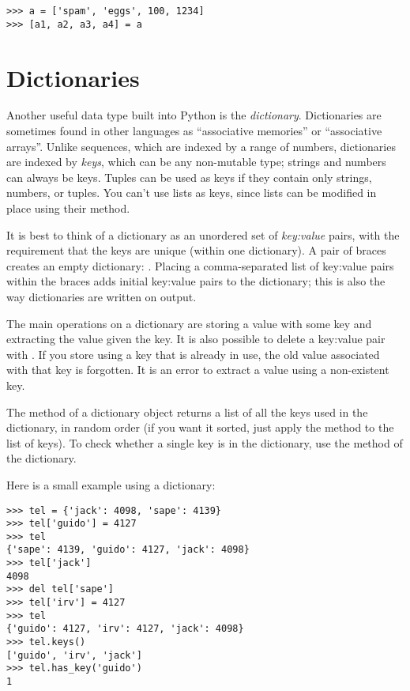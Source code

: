 \documentclass{manual}
\begin{document}
\begin{verbatim}
>>> a = ['spam', 'eggs', 100, 1234]
>>> [a1, a2, a3, a4] = a
\end{verbatim}

\section{Dictionaries}
\label{dictionaries}

Another useful data type built into Python is the \emph{dictionary}.
Dictionaries are sometimes found in other languages as ``associative
memories'' or ``associative arrays''.  Unlike sequences, which are
indexed by a range of numbers, dictionaries are indexed by \emph{keys},
which can be any non-mutable type; strings and numbers can always be
keys.  Tuples can be used as keys if they contain only strings,
numbers, or tuples.  You can't use lists as keys, since lists can be
modified in place using their  method.

It is best to think of a dictionary as an unordered set of
\emph{key:value} pairs, with the requirement that the keys are unique
(within one dictionary).
A pair of braces creates an empty dictionary: \code{\{\}}.
Placing a comma-separated list of key:value pairs within the
braces adds initial key:value pairs to the dictionary; this is also the
way dictionaries are written on output.

The main operations on a dictionary are storing a value with some key
and extracting the value given the key.  It is also possible to delete
a key:value pair
with .
If you store using a key that is already in use, the old value
associated with that key is forgotten.  It is an error to extract a
value using a non-existent key.

The  method of a dictionary object returns a list of all the
keys used in the dictionary, in random order (if you want it sorted,
just apply the  method to the list of keys).  To check
whether a single key is in the dictionary, use the 
method of the dictionary.

Here is a small example using a dictionary:

\begin{verbatim}
>>> tel = {'jack': 4098, 'sape': 4139}
>>> tel['guido'] = 4127
>>> tel
{'sape': 4139, 'guido': 4127, 'jack': 4098}
>>> tel['jack']
4098
>>> del tel['sape']
>>> tel['irv'] = 4127
>>> tel
{'guido': 4127, 'irv': 4127, 'jack': 4098}
>>> tel.keys()
['guido', 'irv', 'jack']
>>> tel.has_key('guido')
1
\end{verbatim}
\end{document}
